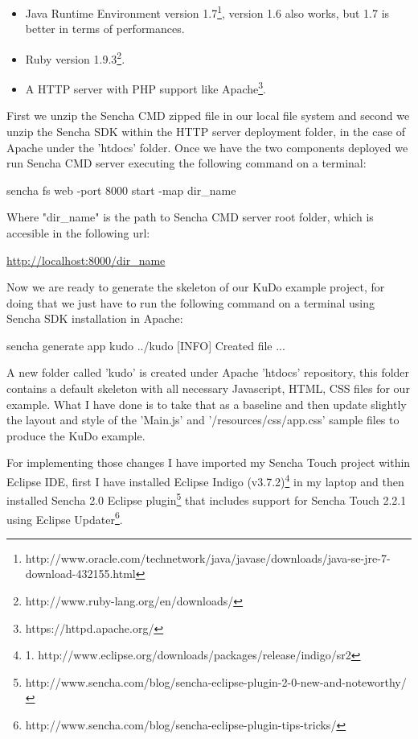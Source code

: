 \documentclass[a4paper,12pt]{book}
\begin{document}
\begin{itemize}
 \item Java Runtime Environment version 1.7\footnote{http://www.oracle.com/technetwork/java/javase/downloads/java-se-jre-7-download-432155.html}, version 1.6 also works, but 1.7 is better in terms of performances.
 \item Ruby version 1.9.3\footnote{http://www.ruby-lang.org/en/downloads/}.
 \item A HTTP server with PHP support like Apache\footnote{https://httpd.apache.org/}.
\end{itemize}

First we unzip the Sencha CMD zipped file in our local file system and second we unzip the Sencha SDK within the HTTP server deployment folder, in the case of Apache under the 'htdocs' folder. Once we have the two components deployed we run Sencha CMD server executing the following command on a terminal:

\begin{code}
sencha fs web -port 8000 start -map dir_name
\end{code}

Where "dir\_name" is the path to Sencha CMD server root folder, which is accesible in the following url:

\url{http://localhost:8000/dir\_name}

Now we are ready to generate the skeleton of our KuDo example project, for doing that we just have to run the following command on a terminal using Sencha SDK installation in Apache:

\begin{code}
sencha generate app kudo ../kudo
[INFO] Created file ...
\end{code}

A new folder called 'kudo' is created under Apache 'htdocs' repository, this folder contains a default skeleton with all necessary Javascript, HTML, CSS files for our example. What I have done is to take that as a baseline and then update slightly the layout and style of the 'Main.js' and '/resources/css/app.css' sample files to produce the KuDo example. 

For implementing those changes I have imported my Sencha Touch project within Eclipse IDE, first I have installed Eclipse Indigo (v3.7.2)\footnote{1. http://www.eclipse.org/downloads/packages/release/indigo/sr2} in my laptop and then installed Sencha 2.0 Eclipse plugin\footnote{http://www.sencha.com/blog/sencha-eclipse-plugin-2-0-new-and-noteworthy/} that includes support for Sencha Touch 2.2.1 using Eclipse Updater\footnote{http://www.sencha.com/blog/sencha-eclipse-plugin-tips-tricks/}. 
\end{document}
